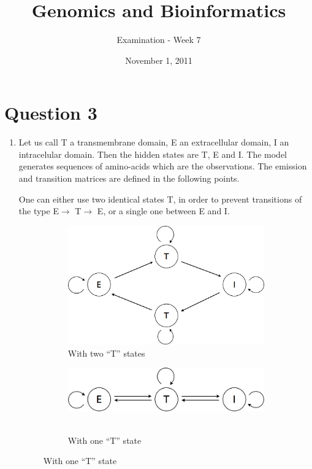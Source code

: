 \documentclass[a4paper,11pt]{article}
\title{Genomics and Bioinformatics}
\date{November 1, 2011}
\author{Examination - Week 7}
\begin{document}
\section*{Question 3}
\begin{enumerate}

\item Let us call T a transmembrane domain, E an extracellular domain, I an intracelular domain. 
Then the hidden states are T, E and I.
The model generates sequences of amino-acids which are the observations. 
The emission and transition matrices are defined in the following points.

One can either use two identical states T, in order to prevent transitions of the type E$\rightarrow$ T$\rightarrow$ E, 
or a single one between E and I.

\begin{figure}[hbt]
\centering
\begin{subfigure}[b]{0.3\textwidth}
\includegraphics[width=\textwidth]{figures/hmm_graph1.png}
\caption{With two ``T'' states}
\end{subfigure}
\qquad
\begin{subfigure}[b]{0.3\textwidth}
\includegraphics[width=\textwidth]{figures/hmm_graph2.png}
\\\\
\caption{With one ``T'' state}
\end{subfigure}
\end{figure}


\end{enumerate}
\end{document}
